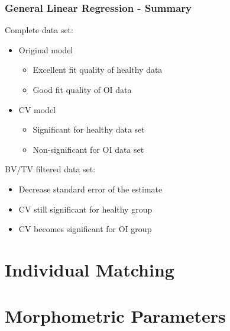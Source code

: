 \documentclass[xcolor=table]{beamer}
\begin{document}
\begin{frame}
	\frametitle{General Linear Regression - Summary}
	Complete data set:
	\begin{itemize}
		\item Original model
		\begin{itemize}
			\item Excellent fit quality of healthy data
			\item Good fit quality of OI data
		\end{itemize} 
		\item CV model
		\begin{itemize}
			\item Significant for healthy data set
			\item Non-significant for OI data set
		\end{itemize}
	\end{itemize}
	\vspace{0.25cm}
	BV/TV filtered data set:
	\begin{itemize}
		\item Decrease standard error of the estimate
		\item CV still significant for healthy group
		\item CV becomes significant for OI group
	\end{itemize} 

\end{frame}



\section{Individual Matching}

\section{Morphometric Parameters}

\end{document}
